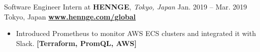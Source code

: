 \cveventflat
{Software Engineer Intern at }
{\textbf{HENNGE}, \textit{Tokyo, Japan}}
{Jan. 2019 -- Mar. 2019}
{Tokyo, Japan}
\newline
\href{https://hennge.com/global/}{\textbf{www.hennge.com/global}}
\begin{itemize}
    \item Introduced Prometheus to monitor AWS ECS clusters and integrated it with Slack.
    \textbf{[Terraform, PromQL, AWS]}
\end{itemize}
